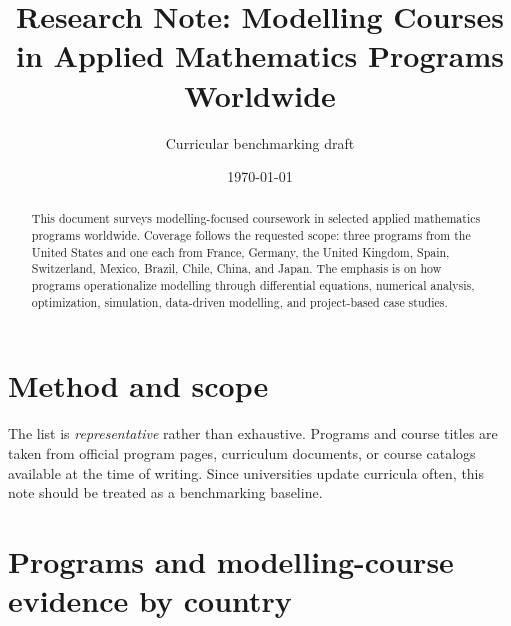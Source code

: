 ﻿\documentclass[11pt,a4paper]{article}
\title{Research Note: Modelling Courses in Applied Mathematics Programs Worldwide}
\author{Curricular benchmarking draft}
\date{\today}
\begin{document}
\maketitle

\begin{abstract}
This document surveys modelling-focused coursework in selected applied mathematics programs worldwide. Coverage follows the requested scope: three programs from the United States and one each from France, Germany, the United Kingdom, Spain, Switzerland, Mexico, Brazil, Chile, China, and Japan. The emphasis is on how programs operationalize modelling through differential equations, numerical analysis, optimization, simulation, data-driven modelling, and project-based case studies.
\end{abstract}

\section{Method and scope}
The list is \emph{representative} rather than exhaustive. Programs and course titles are taken from official program pages, curriculum documents, or course catalogs available at the time of writing. Since universities update curricula often, this note should be treated as a benchmarking baseline.

\section{Programs and modelling-course evidence by country}
\end{document}
